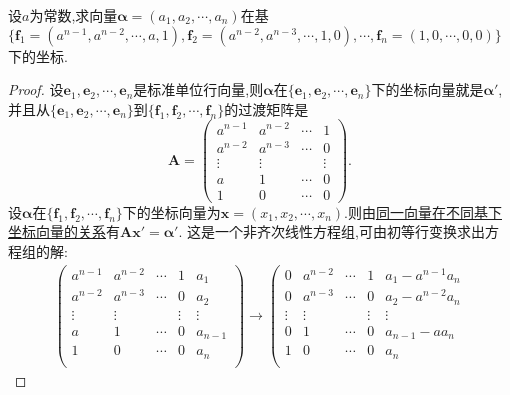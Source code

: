 \documentclass[lang=cn,newtx,10pt,scheme=chinese]{elegantbook}
\begin{document}
\begin{example}
设\(a\)为常数,求向量\(\boldsymbol{\alpha}=(a_1,a_2,\cdots,a_n)\)在基\(\{\boldsymbol{f}_1=(a^{n - 1},a^{n - 2},\cdots,a,1),\boldsymbol{f}_2=(a^{n - 2},a^{n - 3},\cdots,1,0),\cdots,\boldsymbol{f}_n=(1,0,\cdots,0,0)\}\)下的坐标.
\end{example}
\begin{proof}
设\(\boldsymbol{e}_1,\boldsymbol{e}_2,\cdots,\boldsymbol{e}_n\)是标准单位行向量,则\(\boldsymbol{\alpha}\)在\(\{\boldsymbol{e}_1,\boldsymbol{e}_2,\cdots,\boldsymbol{e}_n\}\)下的坐标向量就是$\boldsymbol{\alpha}'$,并且从\(\{\boldsymbol{e}_1,\boldsymbol{e}_2,\cdots,\boldsymbol{e}_n\}\)到\(\{\boldsymbol{f}_1,\boldsymbol{f}_2,\cdots,\boldsymbol{f}_n\}\)的过渡矩阵是
\[
\boldsymbol{A}=\begin{pmatrix}
a^{n - 1}&a^{n - 2}&\cdots&1\\
a^{n - 2}&a^{n - 3}&\cdots&0\\
\vdots&\vdots&&\vdots\\
a&1&\cdots&0\\
1&0&\cdots&0
\end{pmatrix}.
\]
设\(\boldsymbol{\alpha}\)在\(\{\boldsymbol{f}_1,\boldsymbol{f}_2,\cdots,\boldsymbol{f}_n\}\)下的坐标向量为\(\boldsymbol{x}=(x_1,x_2,\cdots,x_n)\).则由\hyperref[theorem:同一向量在不同基下坐标向量的关系]{同一向量在不同基下坐标向量的关系}有\(\boldsymbol{A}\boldsymbol{x}'=\boldsymbol{\alpha}'\). 这是一个非齐次线性方程组,可由初等行变换求出方程组的解:
\begin{gather*}
    \left( \begin{matrix}
        a^{n-1}&		a^{n-2}&		\cdots&		1&		a_1\\
        a^{n-2}&		a^{n-3}&		\cdots&		0&		a_2\\
        \vdots&		\vdots&		&		\vdots&		\vdots\\
        a&		1&		\cdots&		0&		a_{n-1}\\
        1&		0&		\cdots&		0&		a_n\\
    \end{matrix} \right) \rightarrow \left( \begin{matrix}
        0&		a^{n-2}&		\cdots&		1&		a_1-a^{n-1}a_n\\
        0&		a^{n-3}&		\cdots&		0&		a_2-a^{n-2}a_n\\
        \vdots&		\vdots&		&		\vdots&		\vdots\\
        0&		1&		\cdots&		0&		a_{n-1}-aa_n\\
        1&		0&		\cdots&		0&		a_n\\

\end{matrix}
\end{gather*}
\end{proof}
\end{document}
